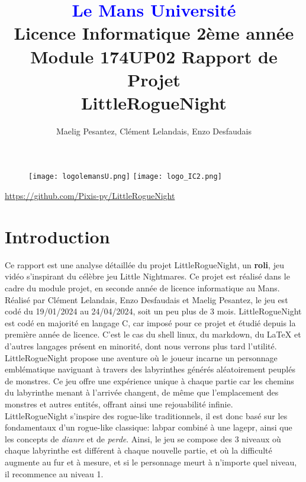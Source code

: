 \documentclass[10pt]{article}
\begin{document}
\begin{figure}
\texttt{[image: logolemansU.png]}
\hspace{160pt}
\texttt{[image: logo\_IC2.png]}
\end{figure}

\title{\textbf{\textcolor{blue}{Le Mans Université}}\\Licence Informatique 2ème année\\Module 174UP02 Rapport de Projet\\\textbf{LittleRogueNight}}
\author{Maelig Pesantez, Clément Lelandais, Enzo Desfaudais}
\maketitle
\hspace{65pt}
\hyperlink{Github}{https://github.com/Pixis-py/LittleRogueNight}

\newpage
\tableofcontents

\newpage

\section{Introduction}
Ce rapport est une analyse détaillée du projet LittleRogueNight, un \textbf{\gls{roli}}, jeu vidéo s'inspirant du célèbre jeu Little Nightmares. 
Ce projet est réalisé dans le cadre du module projet, en seconde année de licence informatique au Mans. Réalisé par Clément Lelandais, Enzo Desfaudais et Maelig Pesantez, le jeu est codé du 19/01/2024 au 24/04/2024, soit un peu plus de 3 mois.
LittleRogueNight est codé en majorité en langage C, car imposé pour ce projet et étudié depuis la première année de licence.
C'est le cas du shell linux, du markdown, du LaTeX et d'autres langages présent en minorité, dont nous verrons plus tard l'utilité.
LittleRogueNight propose une aventure où le joueur incarne un personnage emblématique naviguant à travers des labyrinthes générés aléatoirement peuplés de monstres. 
Ce jeu offre une expérience unique à chaque partie car les chemins du labyrinthe menant à l'arrivée changent, de même que l'emplacement des monstres et autres entités, offrant ainsi une rejouabilité infinie.\\

LittleRogueNight s'inspire des rogue-like traditionnels, il est donc basé sur les fondamentaux d'un rogue-like classique: \gls{labpar} combiné à une
\gls{lagepr}, ainsi que les concepts de \textit{\gls{dianre}} et de \textit{\gls{perde}}. 
Ainsi, le jeu se compose des 3 niveaux où chaque labyrinthe est différent à chaque nouvelle partie, et où la difficulté augmente au fur et à mesure, et si le personnage meurt à n'importe quel niveau, il recommence au niveau 1.\\
\end{document}
